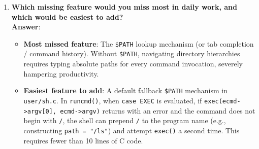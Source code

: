 \documentclass[12pt,a4paper]{article}
\begin{document}
\begin{enumerate}
    \item \textbf{Which missing feature would you miss most in daily work, and which would be easiest to add?} \\
    \textbf{Answer}:
    \begin{itemize}
        \item \textbf{Most missed feature}: The \texttt{\$PATH} lookup mechanism (or tab completion / command history). Without \texttt{\$PATH}, navigating directory hierarchies requires typing absolute paths for every command invocation, severely hampering productivity.
        \item \textbf{Easiest feature to add}: A default fallback \texttt{\$PATH} mechanism in \texttt{user/sh.c}. In \texttt{runcmd()}, when \texttt{case EXEC} is evaluated, if \texttt{exec(ecmd->argv[0], ecmd->argv)} returns with an error and the command does not begin with \texttt{/}, the shell can prepend \texttt{/} to the program name (e.g., constructing \texttt{path = "/ls"}) and attempt \texttt{exec()} a second time. This requires fewer than 10 lines of C code.
    \end{itemize}
\end{enumerate}
\end{document}
